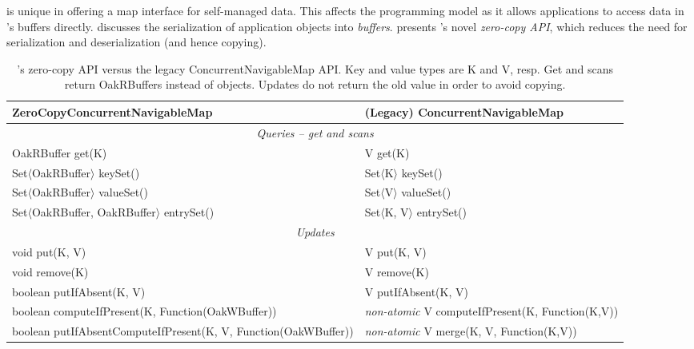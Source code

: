 
\label{sec:model}

\oak\/ is unique in offering a map interface for self-managed data. %
This affects the programming model as it allows applications to  access data in \oak's buffers directly. 
 discusses the serialization of application objects into \emph{\oak\/ buffers}.
  presents 
\oak's novel \emph{zero-copy API}, which reduces the need for serialization and deserialization (and hence copying).%


\begin{table*}[htb]
\setlength{\abovecaptionskip}{5pt}
\setlength{\belowcaptionskip}{5pt}
\begin{tabular}{ll} 
{\bf ZeroCopyConcurrentNavigableMap} & {\bf (Legacy) ConcurrentNavigableMap}\\ 
\hline
\multicolumn{2}{c}{\emph{Queries -- get and scans}}\\
OakRBuffer get(K) & V get(K)\\
Set$\langle$OakRBuffer$\rangle$ keySet() 			 & Set$\langle$K$\rangle$ keySet()\\
Set$\langle$OakRBuffer$\rangle$ valueSet()  			 & Set$\langle$V$\rangle$ valueSet()\\
Set$\langle$OakRBuffer, OakRBuffer$\rangle$ entrySet() & Set$\langle$K, V$\rangle$ entrySet()\\
\multicolumn{2}{c}{\emph{Updates}}\\
void put(K, V) & V put(K, V)\\
void remove(K) &  V remove(K)\\
boolean putIfAbsent(K, V) & V putIfAbsent(K, V)\\
boolean computeIfPresent(K, Function(OakWBuffer))	&  {\it non-atomic} V computeIfPresent(K, Function(K,V)) \\
boolean putIfAbsentComputeIfPresent(K, V, Function(OakWBuffer)) & {\it non-atomic} V merge(K, V, Function(K,V)) \\
\hline
\end{tabular}
\caption{\oak's zero-copy API versus the legacy ConcurrentNavigableMap API. 
Key and value types are K and V, resp. 
Get and scans return OakRBuffers instead of objects. Updates
do not return the old value in order to avoid copying. 
}
\label{alg:api}
\end{table*}



